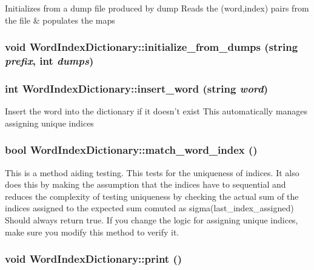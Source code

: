 \label{class_word_index_dictionary_abbc261e4c314aace9917fcb5c5ec127f}
Initializes from a dump file produced by dump Reads the (word,index) pairs from the file \& populates the maps \hypertarget{class_word_index_dictionary_a83c3a82b71ffec88dee7b58c01234de0}{
\subsubsection[{initialize\_\-from\_\-dumps}]{\setlength{\rightskip}{0pt plus 5cm}void WordIndexDictionary::initialize\_\-from\_\-dumps (string {\em prefix}, \/  int {\em dumps})}}
\label{class_word_index_dictionary_a83c3a82b71ffec88dee7b58c01234de0}
\hypertarget{class_word_index_dictionary_a1aef628d50e42417dd1099598687c848}{
\subsubsection[{insert\_\-word}]{\setlength{\rightskip}{0pt plus 5cm}int WordIndexDictionary::insert\_\-word (string {\em word})}}
\label{class_word_index_dictionary_a1aef628d50e42417dd1099598687c848}
Insert the word into the dictionary if it doesn't exist This automatically manages assigning unique indices \hypertarget{class_word_index_dictionary_aaadc560c3572f6e3006212d9b56c32b2}{
\subsubsection[{match\_\-word\_\-index}]{\setlength{\rightskip}{0pt plus 5cm}bool WordIndexDictionary::match\_\-word\_\-index ()}}
\label{class_word_index_dictionary_aaadc560c3572f6e3006212d9b56c32b2}
This is a method aiding testing. This tests for the uniqueness of indices. It also does this by making the assumption that the indices have to sequential and reduces the complexity of testing uniqueness by checking the actual sum of the indices assigned to the expected sum comuted as sigma(last\_\-index\_\-assigned) Should always return true. If you change the logic for assigning unique indices, make sure you modify this method to verify it. \hypertarget{class_word_index_dictionary_a4781b2b79231219cb3ecbe59e8adb483}{
\subsubsection[{print}]{\setlength{\rightskip}{0pt plus 5cm}void WordIndexDictionary::print ()}}
